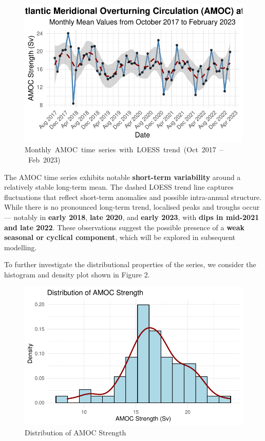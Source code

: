 \documentclass[
  11pt,
]{article}
\begin{document}
\begin{figure}[H]

{\centering \includegraphics{project_files/figure-pdf/fig-monthly amoc-1.pdf}

}

\caption{Monthly~AMOC~time~series~with~LOESS~trend~(Oct~2017~--~Feb~2023)}

\end{figure}%

The AMOC time series exhibits notable \textbf{short-term variability}
around a relatively stable long-term mean. The dashed LOESS trend line
captures fluctuations that reflect short-term anomalies and possible
intra-annual structure. While there is no pronounced long-term trend,
localised peaks and troughs occur --- notably in \textbf{early 2018},
\textbf{late 2020}, and \textbf{early 2023}, with \textbf{dips in
mid-2021 and late 2022}. These observations suggest the possible
presence of a \textbf{weak seasonal or cyclical component}, which will
be explored in subsequent modelling.

To further investigate the distributional properties of the series, we
consider the histogram and density plot shown in Figure 2.

\begin{figure}[H]

{\centering \includegraphics{project_files/figure-pdf/fig-AMOC Histo-1.pdf}

}

\caption{Distribution of AMOC Strength}

\end{figure}%
\end{document}
